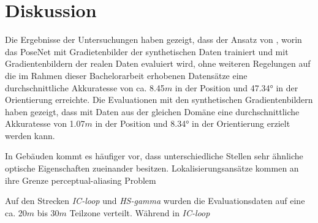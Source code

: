 
\section{Diskussion}
\label{sec:kapitel_5}

Die Ergebnisse der Untersuchungen haben gezeigt, dass der Ansatz von \citet{acharyaBIMPoseNetIndoorCamera2019}, worin das PoseNet mit Gradietenbilder der synthetischen Daten trainiert und mit Gradientenbildern der realen Daten evaluiert wird, ohne weiteren Regelungen auf die im Rahmen dieser Bachelorarbeit erhobenen Datensätze eine durchschnittliche Akkuratesse von ca. 8.45$m$ in der Position und 47.34° in der Orientierung erreichte. Die Evaluationen mit den synthetischen Gradientenbildern haben gezeigt, dass mit Daten aus der gleichen Domäne eine durchschnittliche Akkuratesse von 1.07$m$ in der Position und 8.34° in der Orientierung erzielt werden kann. 


In Gebäuden kommt es häufiger vor, dass unterschiedliche Stellen sehr ähnliche optische Eigenschaften zueinander besitzen.
Lokalisierungsansätze kommen an ihre Grenze 
perceptual-aliasing Problem

Auf den Strecken \textit{IC-loop} und \textit{HS-gamma} wurden die Evaluationsdaten auf eine ca. 20$m$ bis 30$m$ Teilzone verteilt. Während in \textit{IC-loop} 


%



% 




